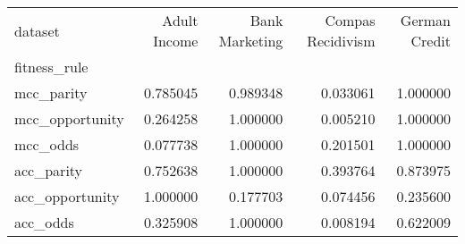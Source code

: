 \begin{tabular}{lrrrr}
\toprule
dataset & Adult Income & Bank Marketing & Compas Recidivism & German Credit \\
fitness_rule &  &  &  &  \\
\midrule
mcc_parity & 0.785045 & 0.989348 & 0.033061 & 1.000000 \\
mcc_opportunity & 0.264258 & 1.000000 & 0.005210 & 1.000000 \\
mcc_odds & 0.077738 & 1.000000 & 0.201501 & 1.000000 \\
acc_parity & 0.752638 & 1.000000 & 0.393764 & 0.873975 \\
acc_opportunity & 1.000000 & 0.177703 & 0.074456 & 0.235600 \\
acc_odds & 0.325908 & 1.000000 & 0.008194 & 0.622009 \\
\bottomrule
\end{tabular}
